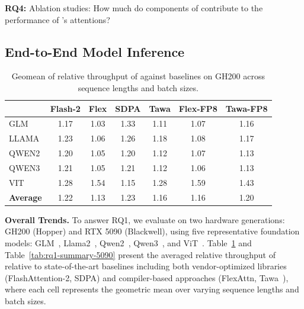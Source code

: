 \noindent\textbf{RQ4:}
Ablation studies: How much do components of \NAME{} contribute to the performance of
\NAME{}'s attentions?

\subsection{End-to-End Model Inference}
\label{sec:eval-e2e}

\begin{table}[b!]
  \centering
  \small
  \setlength{\tabcolsep}{2.5pt}
  \caption{Geomean of relative throughput of \NAME{} against baselines on GH200
  across sequence lengths and batch sizes.}
  \label{tab:rq1-summary}
  \def\dgbox{\diagbox[width=6em, height=2.5em]{Model}{Method}}
  \renewcommand{\arraystretch}{0.93}
  \begin{tabular}{l|cccccc}
    \toprule
    \dgbox & Flash-2 & Flex & SDPA & Tawa & Flex-FP8 & Tawa-FP8 \\
    \midrule
    GLM     & 1.17 & 1.03 & 1.33 & 1.11 & 1.07 & 1.16 \\
    LLAMA   & 1.23 & 1.06 & 1.26 & 1.18 & 1.08 & 1.17 \\
    QWEN2   & 1.20 & 1.05 & 1.20 & 1.12 & 1.07 & 1.13 \\
    QWEN3   & 1.21 & 1.05 & 1.21 & 1.12 & 1.06 & 1.13 \\
    VIT     & 1.28 & 1.54 & 1.15 & 1.28 & 1.59 & 1.43 \\
    \bottomrule
    \textbf{Average} & 1.22 & 1.13 & 1.23 & 1.16 & 1.16 & 1.20 \\
    \bottomrule
  \end{tabular}\vspace{-.03in}
\end{table}

\textbf{Overall Trends.}
To answer RQ1, we evaluate \NAME{} on two hardware generations: GH200 (Hopper) and RTX
5090 (Blackwell), using five representative foundation models:
GLM~\cite{du2022glmgenerallanguagemodel}, Llama2~\cite{touvron2023llama2openfoundation},
Qwen2~\cite{yang2024qwen2technicalreport}, Qwen3~\cite{yang2025qwen3technicalreport}, and
ViT~\cite{dosovitskiy2021imageworth16x16words}.
Table~\ref{tab:rq1-summary} and Table~\ref{tab:rq1-summary-5090} present the averaged
relative throughput of \NAME{} relative to state-of-the-art baselines including both
vendor-optimized libraries (FlashAttention-2, SDPA) and compiler-based approaches
(FlexAttn, Tawa~\cite{tawa}), where each cell represents the geometric mean over varying
sequence lengths and batch sizes.

